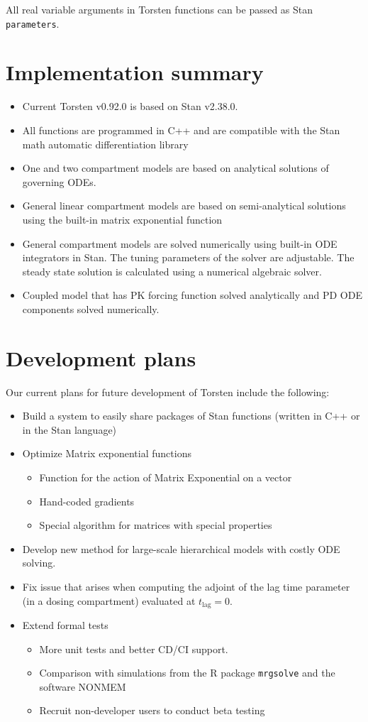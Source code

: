 \documentclass[12pt, reqno, oneside]{amsbook}
\numberwithin{equation}{chapter}
\numberwithin{figure}{chapter}
\numberwithin{table}{chapter}
\theoremstyle{remark}
\begin{document}
All real variable arguments in Torsten functions can be passed as Stan \texttt{parameters}.

\section{Implementation summary}
\label{sec:orgabe7e42}
\begin{itemize}
\item Current Torsten v0.92.0 is based on Stan v2.38.0.
\item All functions are programmed in C++ and are compatible
with the Stan math automatic differentiation library \cite{carpenter15_stan_math_librar}
\item One and two compartment models are based on analytical solutions of governing ODEs.
\item General linear compartment models are based on semi-analytical solutions using the built-in matrix exponential function
\item General compartment models are solved numerically using built-in ODE integrators in Stan. The tuning parameters of the solver are adjustable. The steady state solution is calculated using a numerical algebraic solver.
\item Coupled model that has PK forcing function solved analytically and PD ODE components solved numerically.
\end{itemize}

\section{Development plans}
\label{sec:org8ee92bb}
Our current plans for future development of Torsten include the
following:
\begin{itemize}
\item Build a system to easily share packages of Stan functions
(written in C++ or in the Stan language)
\item Optimize Matrix exponential functions
\begin{itemize}
\item Function for the action of Matrix Exponential on a vector
\item Hand-coded gradients
\item Special algorithm for matrices with special properties
\end{itemize}
\item Develop new method for large-scale hierarchical models with costly
ODE solving.
\item Fix issue that arises when computing the adjoint of the lag time
parameter (in a dosing compartment) evaluated at \(t_{\text{lag}} = 0\).
\item Extend formal tests
\begin{itemize}
\item More unit tests and better CD/CI support.
\item Comparison with simulations from the R package
\texttt{mrgsolve} and the software NONMEM\textregistered{}
\item Recruit non-developer users to conduct beta testing
\end{itemize}
\end{itemize}
\end{document}
